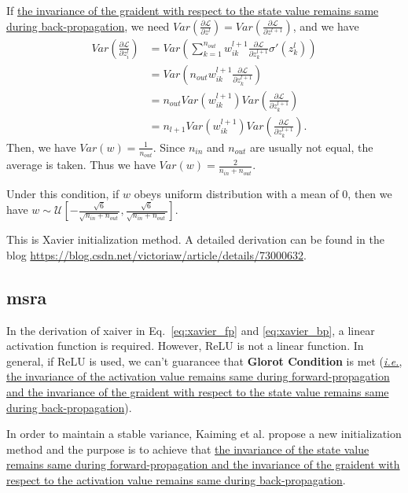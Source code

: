 \documentclass[10pt,onecolumn]{book}
\def\ie{\emph{i.e.}}
\begin{document}
If \uline{the invariance of the graident with respect to the state value remains same during back-propagation}, we need $Var(\frac{\partial{\mathcal{L}}}{\partial z^l}) = Var(\frac{\partial{\mathcal{L}}}{\partial z^{l + 1}})$, and we have
\begin{equation}
\begin{split}
Var(\frac{\partial{\mathcal{L}}}{\partial z^l_{i}}) &= 
Var( \sum_{k = 1}^{n_{out}} w^{l+1}_{ik} \frac{\partial{\mathcal{L}}}{\partial z^{l+1}_{k}}  \sigma'(z^l_k)) \\
	&= Var( n_{out} w^{l+1}_{ik} \frac{\partial{\mathcal{L}}}{\partial z^{l+1}_k}) \\
	&= n_{out} Var(w^{l + 1}_{ik}) Var(\frac{\partial{\mathcal{L}}}{\partial z^{l+1}_k}) \\
	&= n_{l+1} Var(w^{l + 1}_{ik}) Var(\frac{\partial{\mathcal{L}}}{\partial z^{l+1}_k}).
\end{split}
\end{equation}
Then, we have $Var(w) = \frac{1}{n_{out}}$. Since $n_{in}$ and $n_{out}$ are usually not equal, the average is taken. Thus we have $Var(w)  = \frac{2}{n_{in} + n_{out}}$.

Under this condition, if $w$ obeys uniform distribution with a mean of 0, then we have $w \sim \mathcal{U}[- \frac{\sqrt{6}}{\sqrt{n_{in} + n_{out}}},  \frac{\sqrt{6}}{\sqrt{n_{in} + n_{out}}}]$.

This is Xavier initialization method. A detailed derivation can be found in the blog \url{https://blog.csdn.net/victoriaw/article/details/73000632}.

\subsection{msra}
In the derivation of xaiver in Eq.~\ref{eq:xavier_fp} and \ref{eq:xavier_bp}, a linear activation function is required. However, ReLU is not a linear function. In general, if ReLU is used, we can't guarancee that \textbf{Glorot Condition} is met (\uline{\ie, the invariance of the activation value remains same during forward-propagation and the invariance of the graident with respect to the state value remains same during back-propagation}).

In order to maintain a stable variance, Kaiming et al. propose a new initialization method and the purpose is to achieve that \uline{the invariance of the state value remains same during forward-propagation and the invariance of the graident with respect to the activation value remains same during back-propagation}.
\end{document}

